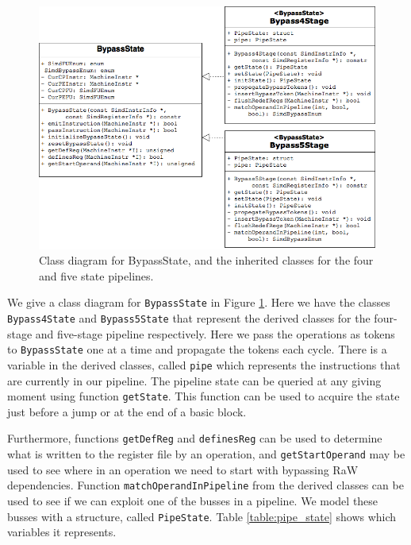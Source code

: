 \begin{figure}[t]
\centering
\includegraphics[width=\textwidth]{figures/class_diag_bpstate}
\caption{Class diagram for BypassState, and the inherited classes for the four and five state pipelines.}
\label{fig:class_diagram_bpstate}
\end{figure}

We give a class diagram for \texttt{BypassState} in Figure \ref{fig:class_diagram_bpstate}. Here we have the classes  \texttt{Bypass4State} and \texttt{Bypass5State} that represent the derived classes for the four-stage and five-stage pipeline respectively. Here we pass the operations as tokens to \texttt{BypassState} one at a time and propagate the tokens each cycle. There is a variable in the derived classes, called \texttt{pipe} which represents the instructions that are currently in our pipeline. The pipeline state can be queried at any giving moment using function \texttt{getState}. This function can be used to acquire the state just before a jump or at the end of a basic block.

Furthermore, functions \texttt{getDefReg} and \texttt{definesReg} can be used to determine what is written to the register file by an operation, and \texttt{getStartOperand} may be used to see where in an operation we need to start with bypassing RaW dependencies. Function \texttt{matchOperandInPipeline} from the derived classes can be used to see if we can exploit one of the busses in a pipeline. We model these busses with a structure, called \texttt{PipeState}. Table \ref{table:pipe_state} shows which variables it represents.

